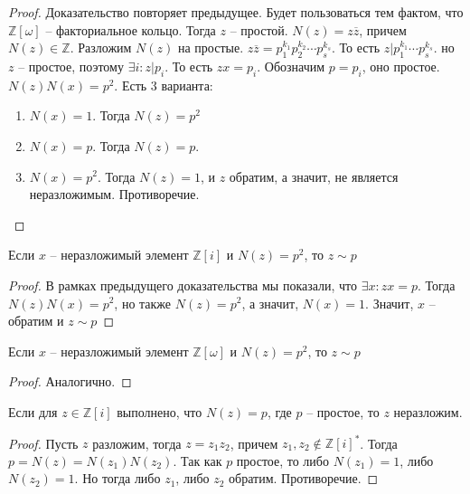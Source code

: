 \documentclass{article}
\begin{document}
\begin{proof}
    Доказательство повторяет предыдущее.
    Будет пользоваться тем фактом, что $\mathbb{Z}[\omega]$ -- факториальное кольцо. Тогда $z$ -- простой. $N(z) = z
    \overline z$, причем $N(z) \in \mathbb{Z}$. Разложим $N(z)$ на простые. $z \overline z = p_1^{k_1} p_2^{k_2} \cdots
    p_s^{k_s}$. То есть $z | p_1^{k_1} \cdots p_s^{k_s}$. но $z$ -- простое, поэтому $\exists i: z | p_i$. То есть $z x
    = p_i$. Обозначим $p = p_i$, оно простое. $N(z) N(x) = p^2$. Есть 3 варианта:
    \begin{enumerate}
        \item $N(x) = 1$. Тогда $N(z) = p^2$
        \item $N(x) = p$. Тогда $N(z) = p$.
        \item $N(x) = p^2$. Тогда $N(z) = 1$, и $z$ обратим, а значит, не является неразложимым. Противоречие.
    \end{enumerate}
\end{proof}

\begin{statement}
    Если $x$ -- неразложимый элемент $\mathbb{Z}[i]$ и $N(z) = p^2$, то $z \sim p$
\end{statement}

\begin{proof}
    В рамках предыдущего доказательства мы показали, что $\exists x: zx = p$. Тогда $N(z) N(x) = p^2$, но также $N(z) =
    p^2$, а значит, $N(x) = 1$. Значит, $x$ -- обратим и $z \sim p$
\end{proof}


\begin{statement}
    Если $x$ -- неразложимый элемент $\mathbb{Z}[\omega]$ и $N(z) = p^2$, то $z \sim p$
\end{statement}

\begin{proof}
    Аналогично.
\end{proof}

\begin{statement}
    Если для $z \in \mathbb{Z}[i]$ выполнено, что $N(z) = p$, где $p$ -- простое, то $z$ неразложим.
\end{statement}

\begin{proof}
    Пусть $z$ разложим, тогда $z = z_1 z_2$, причем $z_1, z_2 \not \in \mathbb{Z}[i]^*$. Тогда $p = N(z) = N(z_1)
    N(z_2)$. Так как $p$ простое, то либо $N(z_1) = 1$, либо $N(z_2) = 1$. Но тогда либо $z_1$, либо $z_2$ обратим.
    Противоречие.
\end{proof}
\end{document}
